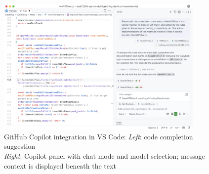 \begin{figure}[h]
    \centering
    \includegraphics[width=0.9\textwidth]{static/vscode-copilot.png}
    \captionsetup{justification=raggedright,singlelinecheck=false}
    \caption{%
        GitHub Copilot integration in VS Code: \emph{Left}: code completion suggestion\\%
        \emph{Right}: Copilot panel with chat mode and model selection; message context is displayed beneath the text%
    }
    \label{fig:copilot-ui}
\end{figure}